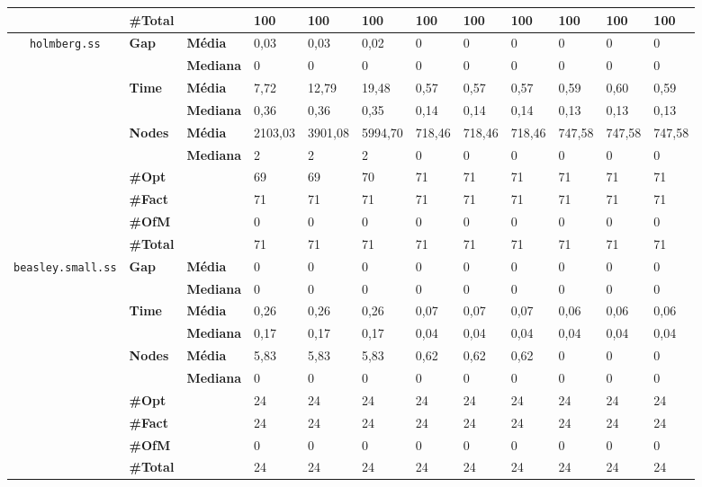 \begin{table}[]
\begin{adjustbox}{angle=90}
\begin{tabular}{cll|lll|lll|lll}
 & \textbf{\#Total} & & 100 & 100 & 100 & 100 & 100 & 100 & 100 & 100 & 100 \\
\hline
\multirow{7}{*}{\texttt{holmberg.ss}} & \multirow{2}{*}{\textbf{Gap}} & \textbf{Média} & 0,03 & 0,03 & 0,02 & 0 & 0 & 0 & 0 & 0 & 0 \\
 & & \textbf{Mediana} & 0 & 0 & 0 & 0 & 0 & 0 & 0 & 0 & 0 \\
\cline{2-12}
 & \multirow{2}{*}{\textbf{Time}} & \textbf{Média} & 7,72 & 12,79 & 19,48 & 0,57 & 0,57 & 0,57 & 0,59 & 0,60 & 0,59 \\
 & & \textbf{Mediana} & 0,36 & 0,36 & 0,35 & 0,14 & 0,14 & 0,14 & 0,13 & 0,13 & 0,13 \\
\cline{2-12}
 & \multirow{2}{*}{\textbf{Nodes}} & \textbf{Média} & 2103,03 & 3901,08 & 5994,70 & 718,46 & 718,46 & 718,46 & 747,58 & 747,58 & 747,58 \\
 & & \textbf{Mediana} & 2 & 2 & 2 & 0 & 0 & 0 & 0 & 0 & 0 \\
\cline{2-12}
 & \textbf{\#Opt} & & 69 & 69 & 70 & 71 & 71 & 71 & 71 & 71 & 71 \\
 & \textbf{\#Fact} & & 71 & 71 & 71 & 71 & 71 & 71 & 71 & 71 & 71 \\
 & \textbf{\#OfM} & & 0 & 0 & 0 & 0 & 0 & 0 & 0 & 0 & 0 \\
 & \textbf{\#Total} & & 71 & 71 & 71 & 71 & 71 & 71 & 71 & 71 & 71 \\
\hline
\multirow{7}{*}{\texttt{beasley.small.ss}} & \multirow{2}{*}{\textbf{Gap}} & \textbf{Média} & 0 & 0 & 0 & 0 & 0 & 0 & 0 & 0 & 0 \\
 & & \textbf{Mediana} & 0 & 0 & 0 & 0 & 0 & 0 & 0 & 0 & 0 \\
\cline{2-12}
 & \multirow{2}{*}{\textbf{Time}} & \textbf{Média} & 0,26 & 0,26 & 0,26 & 0,07 & 0,07 & 0,07 & 0,06 & 0,06 & 0,06 \\
 & & \textbf{Mediana} & 0,17 & 0,17 & 0,17 & 0,04 & 0,04 & 0,04 & 0,04 & 0,04 & 0,04 \\
\cline{2-12}
 & \multirow{2}{*}{\textbf{Nodes}} & \textbf{Média} & 5,83 & 5,83 & 5,83 & 0,62 & 0,62 & 0,62 & 0 & 0 & 0 \\
 & & \textbf{Mediana} & 0 & 0 & 0 & 0 & 0 & 0 & 0 & 0 & 0 \\
\cline{2-12}
 & \textbf{\#Opt} & & 24 & 24 & 24 & 24 & 24 & 24 & 24 & 24 & 24 \\
 & \textbf{\#Fact} & & 24 & 24 & 24 & 24 & 24 & 24 & 24 & 24 & 24 \\
 & \textbf{\#OfM} & & 0 & 0 & 0 & 0 & 0 & 0 & 0 & 0 & 0 \\
 & \textbf{\#Total} & & 24 & 24 & 24 & 24 & 24 & 24 & 24 & 24 & 24 \\
	\end{tabular}
	\end{adjustbox}
\end{table}


